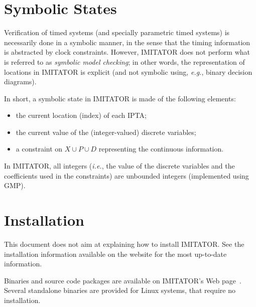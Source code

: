 \documentclass[a4paper,11pt]{report}
\makeatletter
\newcommand{\Clock}{X} %
\newcommand{\DVar}{D} %
\newcommand{\Param}{P} %
\newcommand{\imitator}{\textsf{IMITATOR}}
\newcommand{\IPTA}{IPTA}
\newcommand{\eg}{\textcolor{colorok}{\textit{e.g.},\@}}
\newcommand{\ie}{\textcolor{colorok}{\textit{i.e.},\@}}
\makeatother
\begin{document}
\section{Symbolic States}

Verification of timed systems (and specially parametric timed systems) is necessarily done in a symbolic manner, in the sense that the timing information is abstracted by clock constraints.
However, \imitator{} does not perform what is referred to as \emph{symbolic model checking}; in other words, the representation of locations in \imitator{} is explicit (and not symbolic using, \eg{} binary decision diagrams).


In short, a symbolic state in \imitator{} is made of the following elements:
\begin{itemize}
	\item the current location (index) of each \IPTA{};
	\item the current value of the (integer-valued) discrete variables;
	\item a constraint on $\Clock \cup \Param \cup \DVar$ representing the continuous information.
\end{itemize}
In \imitator{}, all integers (\ie{} the value of the discrete variables and the coefficients used in the constraints) are unbounded integers (implemented using GMP).



\section{Installation}

This document does not aim at explaining how to install \imitator{}.
See the installation information available on the website for the most up-to-date information.

Binaries and source code packages are available on \imitator{}'s Web page~\cite{imitator}.
Several standalone binaries are provided for Linux systems, that require no installation.








\end{document}
